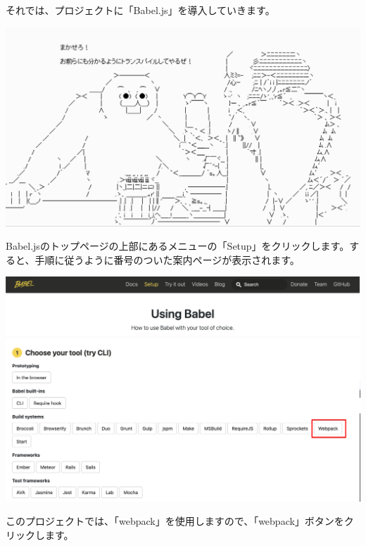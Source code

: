 それでは、プロジェクトに「Babel.js」を導入していきます。

\begin{reviewimage}[H]%
\includegraphics[width=0.8\maxwidth]{./images/02-create-react-app/transpaile.png}%
\label{image:02-create-react-app:transpaile}
\end{reviewimage}

Babel.jsのトップページの上部にあるメニューの「Setup」をクリックします。すると、手順に従うように番号のついた案内ページが表示されます。

\begin{reviewimage}[H]%
\includegraphics[width=0.9\maxwidth]{./images/02-create-react-app/babel02.png}%
\label{image:02-create-react-app:babel02}
\end{reviewimage}

このプロジェクトでは、「webpack」を使用しますので、「webpack」ボタンをクリックします。

\vspace*{\baselineskip}

